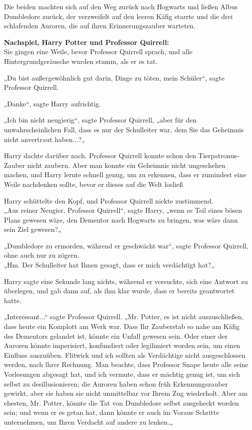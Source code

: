 {Die beiden machten sich auf den Weg zurück nach Hogwarts und ließen Albus Dumbledore zurück, der verzweifelt auf den leeren Käfig starrte und die drei schlafenden Auroren, die auf ihren Erinnerungszauber warteten.

\textbf{Nachspiel, Harry Potter und Professor Quirrell:}\\ Sie gingen eine Weile, bevor Professor Quirrell sprach, und alle Hintergrundgeräusche wurden stumm, als er es tat.

„Du bist außergewöhnlich gut darin, Dinge zu töten, mein Schüler“, sagte Professor Quirrell.

„Danke“, sagte Harry aufrichtig.

„Ich bin nicht neugierig“, sagte Professor Quirrell, „aber für den unwahrscheinlichen Fall, dass es nur der Schulleiter war, dem Sie das Geheimnis nicht anvertraut haben...?„

Harry dachte darüber nach. Professor Quirrell konnte schon den Tierpatronus-Zauber nicht zaubern. Aber man konnte ein Geheimnis nicht ungeschehen machen, und Harry lernte schnell genug, um zu erkennen, dass er zumindest eine Weile nachdenken sollte, bevor er dieses auf die Welt losließ.

Harry schüttelte den Kopf, und Professor Quirrell nickte zustimmend.\\ „Aus reiner Neugier, Professor Quirrell“, sagte Harry, „wenn es Teil eines bösen Plans gewesen wäre, den Dementor nach Hogwarts zu bringen, was wäre dann sein Ziel gewesen?„

„Dumbledore zu ermorden, während er geschwächt war“, sagte Professor Quirrell, ohne auch nur zu zögern.\\ „Hm. Der Schulleiter hat Ihnen gesagt, dass er mich verdächtigt hat?„

Harry sagte eine Sekunde lang nichts, während er versuchte, sich eine Antwort zu überlegen, und gab dann auf, als ihm klar wurde, dass er bereits geantwortet hatte.

„Interessant...“ sagte Professor Quirrell. „Mr. Potter, es ist nicht auszuschließen, dass heute ein Komplott am Werk war. Dass Ihr Zauberstab so nahe am Käfig des Dementors gelandet ist, könnte ein Unfall gewesen sein. Oder einer der Auroren könnte imperisiert, konfundiert oder legilimiert worden sein, um einen Einfluss auszuüben. Flitwick und ich sollten als Verdächtige nicht ausgeschlossen werden, nach lhrer Rechnung. Man beachte, dass Professor Snape heute alle seine Vorlesungen abgesagt hat, und ich vermute, dass er mächtig genug ist, um sich selbst zu desillusionieren; die Auroren haben schon früh Erkennungszauber gewirkt, aber sie haben sie nicht unmittelbar vor Ihrem Zug wiederholt. Aber am ehesten, Mr. Potter, könnte die Tat von Dumbledore selbst ausgeheckt worden sein; und wenn er es getan hat, dann könnte er auch im Voraus Schritte unternehmen, um Ihren Verdacht auf andere zu lenken.„

}
